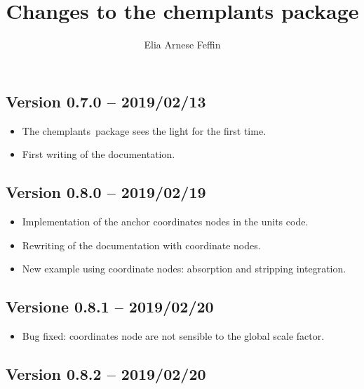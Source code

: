 \documentclass[12pt]{article}						%
\title{Changes to the chemplants package}
\author{Elia Arnese Feffin}
\date{\chpdate}
\newcommand*{\chemplants}{chemplants}
\begin{document}



\maketitle											%


\subsection*{Version 0.7.0 -- 2019/02/13}

\begin{itemize}
	\item The \chemplants\ package sees the light for the first time.
	\item First writing of the documentation.
\end{itemize}

\subsection*{Version 0.8.0 -- 2019/02/19}

\begin{itemize}
	\item Implementation of the anchor coordinates nodes in the units code.
	\item Rewriting of the documentation with coordinate nodes.
	\item New example using coordinate nodes: absorption and stripping
		integration.
\end{itemize}

\subsection*{Versione 0.8.1 -- 2019/02/20}

\begin{itemize}
	\item Bug fixed: coordinates node are not sensible to the global scale
		factor.
\end{itemize}

\subsection*{Version 0.8.2 -- 2019/02/20}
\end{document}
